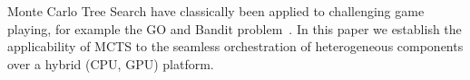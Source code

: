 \documentclass[smallextended]{svjour3}
\begin{document}
%
Monte Carlo Tree Search have classically been applied to challenging game playing, for example the GO and Bandit 
problem~\cite{coulom2007efficient}.
In this paper we establish the applicability of MCTS to the seamless orchestration of heterogeneous components over a hybrid (CPU, GPU) platform.
\end{document}
